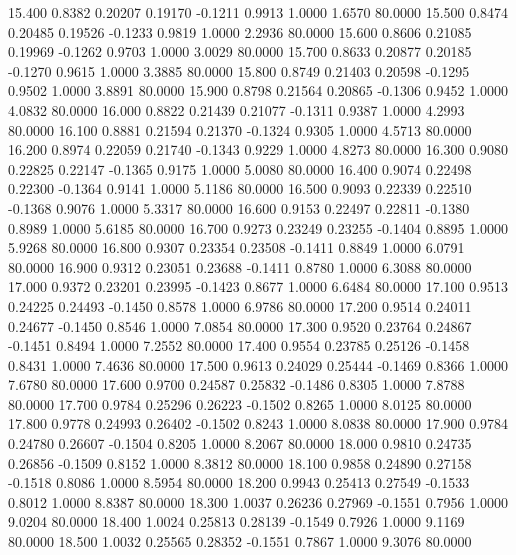   15.400   0.8382   0.20207   0.19170  -0.1211   0.9913   1.0000   1.6570  80.0000
  15.500   0.8474   0.20485   0.19526  -0.1233   0.9819   1.0000   2.2936  80.0000
  15.600   0.8606   0.21085   0.19969  -0.1262   0.9703   1.0000   3.0029  80.0000
  15.700   0.8633   0.20877   0.20185  -0.1270   0.9615   1.0000   3.3885  80.0000
  15.800   0.8749   0.21403   0.20598  -0.1295   0.9502   1.0000   3.8891  80.0000
  15.900   0.8798   0.21564   0.20865  -0.1306   0.9452   1.0000   4.0832  80.0000
  16.000   0.8822   0.21439   0.21077  -0.1311   0.9387   1.0000   4.2993  80.0000
  16.100   0.8881   0.21594   0.21370  -0.1324   0.9305   1.0000   4.5713  80.0000
  16.200   0.8974   0.22059   0.21740  -0.1343   0.9229   1.0000   4.8273  80.0000
  16.300   0.9080   0.22825   0.22147  -0.1365   0.9175   1.0000   5.0080  80.0000
  16.400   0.9074   0.22498   0.22300  -0.1364   0.9141   1.0000   5.1186  80.0000
  16.500   0.9093   0.22339   0.22510  -0.1368   0.9076   1.0000   5.3317  80.0000
  16.600   0.9153   0.22497   0.22811  -0.1380   0.8989   1.0000   5.6185  80.0000
  16.700   0.9273   0.23249   0.23255  -0.1404   0.8895   1.0000   5.9268  80.0000
  16.800   0.9307   0.23354   0.23508  -0.1411   0.8849   1.0000   6.0791  80.0000
  16.900   0.9312   0.23051   0.23688  -0.1411   0.8780   1.0000   6.3088  80.0000
  17.000   0.9372   0.23201   0.23995  -0.1423   0.8677   1.0000   6.6484  80.0000
  17.100   0.9513   0.24225   0.24493  -0.1450   0.8578   1.0000   6.9786  80.0000
  17.200   0.9514   0.24011   0.24677  -0.1450   0.8546   1.0000   7.0854  80.0000
  17.300   0.9520   0.23764   0.24867  -0.1451   0.8494   1.0000   7.2552  80.0000
  17.400   0.9554   0.23785   0.25126  -0.1458   0.8431   1.0000   7.4636  80.0000
  17.500   0.9613   0.24029   0.25444  -0.1469   0.8366   1.0000   7.6780  80.0000
  17.600   0.9700   0.24587   0.25832  -0.1486   0.8305   1.0000   7.8788  80.0000
  17.700   0.9784   0.25296   0.26223  -0.1502   0.8265   1.0000   8.0125  80.0000
  17.800   0.9778   0.24993   0.26402  -0.1502   0.8243   1.0000   8.0838  80.0000
  17.900   0.9784   0.24780   0.26607  -0.1504   0.8205   1.0000   8.2067  80.0000
  18.000   0.9810   0.24735   0.26856  -0.1509   0.8152   1.0000   8.3812  80.0000
  18.100   0.9858   0.24890   0.27158  -0.1518   0.8086   1.0000   8.5954  80.0000
  18.200   0.9943   0.25413   0.27549  -0.1533   0.8012   1.0000   8.8387  80.0000
  18.300   1.0037   0.26236   0.27969  -0.1551   0.7956   1.0000   9.0204  80.0000
  18.400   1.0024   0.25813   0.28139  -0.1549   0.7926   1.0000   9.1169  80.0000
  18.500   1.0032   0.25565   0.28352  -0.1551   0.7867   1.0000   9.3076  80.0000
